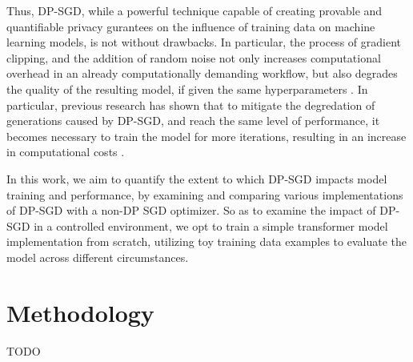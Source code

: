 \documentclass{article}
\begin{document}
Thus, DP-SGD, while a powerful technique capable of creating provable and quantifiable privacy gurantees on the influence of training data on machine learning models, is not without drawbacks. In particular, the process of gradient clipping, and the addition of random noise not only increases computational overhead in an already computationally demanding workflow, but also degrades the quality of the resulting model, if given the same hyperparameters \cite{papernot2017}. In particular, previous research has shown that to mitigate the degredation of generations caused by DP-SGD, and reach the same level of performance, it becomes necessary to train the model for more iterations, resulting in an increase in computational costs \cite{mcmahan2018}.

In this work, we aim to quantify the extent to which DP-SGD impacts model training and performance, by examining and comparing various implementations of DP-SGD with a non-DP SGD optimizer. So as to examine the impact of DP-SGD in a controlled environment, we opt to train a simple transformer model implementation from scratch, utilizing toy training data examples to evaluate the model across different circumstances.

\section{Methodology}

TODO



\end{document}
